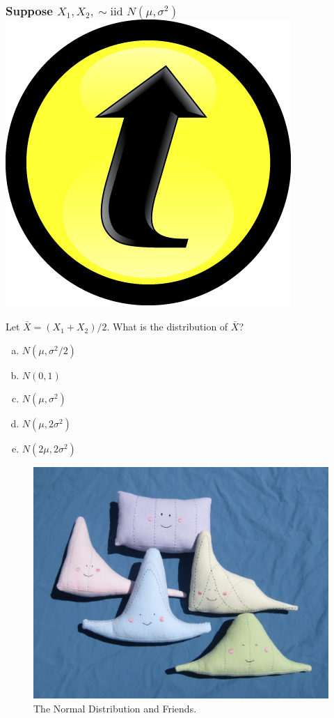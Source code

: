 \documentclass[handout]{beamer}
\begin{document}
\begin{frame}
\frametitle{Suppose $X_1, X_2, \sim \mbox{iid } N(\mu, \sigma^2)$ \hfill \includegraphics[scale = 0.05]{./images/clicker}}

Let $\bar{X} = (X_1 + X_2)/2$. What is the distribution of $\bar{X}$?
\begin{enumerate}[(a)]
\item $N(\mu, \sigma^2/2)$
\item $N(0,1)$
\item $N(\mu, \sigma^2)$
\item $N(\mu, 2\sigma^2)$
\item $N(2\mu, 2\sigma^2)$
\end{enumerate}

\end{frame}
\begin{frame}
\begin{figure}
\includegraphics[scale = 0.2]{./images/normal_friends}
\caption{The Normal Distribution and Friends.}
\end{figure}
\end{frame}
\end{document}
